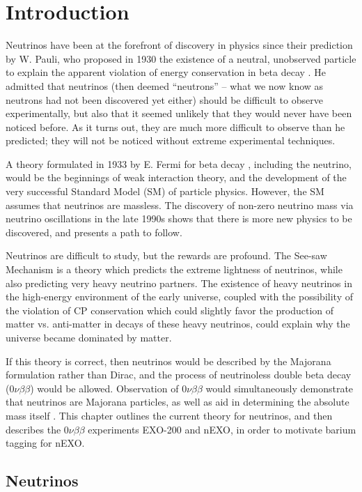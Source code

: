\chapter{Introduction}

Neutrinos have been at the forefront of discovery in physics since their prediction by W. Pauli, who proposed in 1930 the existence of a neutral, unobserved particle to explain the apparent violation of energy conservation in beta decay \cite{betaspectrum}. He admitted that neutrinos (then deemed ``neutrons'' -- what we now know as neutrons had not been discovered yet either) should be difficult to observe experimentally, but also that it seemed unlikely that they would never have been noticed before.  As it turns out, they are much more difficult to observe than he predicted; they will not be noticed without extreme experimental techniques.

A theory formulated in 1933 by E. Fermi for beta decay \cite{FermiBetaDecay}, including the neutrino, would be the beginnings of weak interaction theory, and the development of the very successful Standard Model (SM) of particle physics.  However, the SM assumes that neutrinos are massless.  The discovery of non-zero neutrino mass via neutrino oscillations in the late 1990s \cite{SuperK} shows that there is more new physics to be discovered, and presents a path to follow.

Neutrinos are difficult to study, but the rewards are profound.  The See-saw Mechanism is a theory which predicts the extreme lightness of neutrinos, while also predicting very heavy neutrino partners.  The existence of heavy neutrinos in the high-energy environment of the early universe, coupled with the possibility of the violation of CP conservation which could slightly favor the production of matter vs. anti-matter in decays of these heavy neutrinos, could explain why the universe became dominated by matter.  
\cite{SeeSaw}

If this theory is correct, then neutrinos would be described by the Majorana formulation rather than Dirac, and the process of neutrinoless double beta decay ($0\nu\beta\beta$) would be allowed.  Observation of $0\nu\beta\beta$ would simultaneously demonstrate that neutrinos are Majorana particles, as well as aid in determining the absolute mass itself \cite{effectiveMass}.  This chapter outlines the current theory for neutrinos, and then describes the $0\nu\beta\beta$ experiments EXO-200 and nEXO, in order to motivate barium tagging for nEXO.

\section{Neutrinos}

